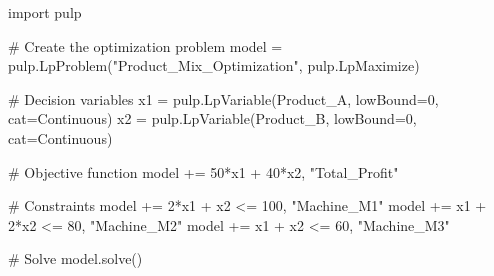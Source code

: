 \documentclass[
  letterpaper,
  DIV=11,
  numbers=noendperiod]{scrreprt}
\newenvironment{Shaded}{\begin{snugshade}}{\end{snugshade}}
\newcommand{\CommentTok}[1]{\textcolor[rgb]{0.37,0.37,0.37}{#1}}
\newcommand{\DecValTok}[1]{\textcolor[rgb]{0.68,0.00,0.00}{#1}}
\newcommand{\ImportTok}[1]{\textcolor[rgb]{0.00,0.46,0.62}{#1}}
\newcommand{\NormalTok}[1]{\textcolor[rgb]{0.00,0.23,0.31}{#1}}
\newcommand{\OperatorTok}[1]{\textcolor[rgb]{0.37,0.37,0.37}{#1}}
\newcommand{\StringTok}[1]{\textcolor[rgb]{0.13,0.47,0.30}{#1}}
\begin{document}
\begin{Shaded}
\begin{Highlighting}[]
\ImportTok{import}\NormalTok{ pulp}

\CommentTok{\# Create the optimization problem}
\NormalTok{model }\OperatorTok{=}\NormalTok{ pulp.LpProblem(}\StringTok{"Product\_Mix\_Optimization"}\NormalTok{, pulp.LpMaximize)}

\CommentTok{\# Decision variables}
\NormalTok{x1 }\OperatorTok{=}\NormalTok{ pulp.LpVariable(}\StringTok{\textquotesingle{}Product\_A\textquotesingle{}}\NormalTok{, lowBound}\OperatorTok{=}\DecValTok{0}\NormalTok{, cat}\OperatorTok{=}\StringTok{\textquotesingle{}Continuous\textquotesingle{}}\NormalTok{)}
\NormalTok{x2 }\OperatorTok{=}\NormalTok{ pulp.LpVariable(}\StringTok{\textquotesingle{}Product\_B\textquotesingle{}}\NormalTok{, lowBound}\OperatorTok{=}\DecValTok{0}\NormalTok{, cat}\OperatorTok{=}\StringTok{\textquotesingle{}Continuous\textquotesingle{}}\NormalTok{)}

\CommentTok{\# Objective function}
\NormalTok{model }\OperatorTok{+=} \DecValTok{50}\OperatorTok{*}\NormalTok{x1 }\OperatorTok{+} \DecValTok{40}\OperatorTok{*}\NormalTok{x2, }\StringTok{"Total\_Profit"}

\CommentTok{\# Constraints}
\NormalTok{model }\OperatorTok{+=} \DecValTok{2}\OperatorTok{*}\NormalTok{x1 }\OperatorTok{+}\NormalTok{ x2 }\OperatorTok{\textless{}=} \DecValTok{100}\NormalTok{, }\StringTok{"Machine\_M1"}
\NormalTok{model }\OperatorTok{+=}\NormalTok{ x1 }\OperatorTok{+} \DecValTok{2}\OperatorTok{*}\NormalTok{x2 }\OperatorTok{\textless{}=} \DecValTok{80}\NormalTok{, }\StringTok{"Machine\_M2"}
\NormalTok{model }\OperatorTok{+=}\NormalTok{ x1 }\OperatorTok{+}\NormalTok{ x2 }\OperatorTok{\textless{}=} \DecValTok{60}\NormalTok{, }\StringTok{"Machine\_M3"}

\CommentTok{\# Solve}
\NormalTok{model.solve()}


\end{Highlighting}
\end{Shaded}
\end{document}
